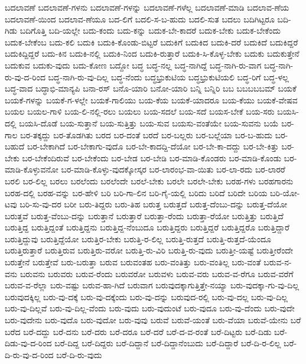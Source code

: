 ಬದಲಾವಣೆ
ಬದಲಾವಣೆ-ಗಳನು
ಬದಲಾವಣೆ-ಗಳನ್ನು
ಬದಲಾವಣೆ-ಗಳೆಲ್ಲ
ಬದಲಾವಣೆ-ಮಾಡಿ
ಬದಲಾವ-ಣೆಯ
ಬದಲಾವಣೆ-ಯಿಂದ
ಬದಲಾವ-ಣೆಯೂ
ಬದ-ಲಿಗೆ
ಬದಲಿ-ಸ-ಬ-ಹುದು
ಬದಲಿ-ಸುತ
ಬದಲು
ಬದಿಗಿಟ್ಟರೂ
ಬದಿ-ಗಿಡು
ಬದಿಗೊತ್ತಿ
ಬದಿ-ಯಲ್ಲೇ
ಬದು-ಕಂದು
ಬದು-ಕನ್ನು
ಬದುಕ-ಬೇ-ಕಾದರೆ
ಬದುಕ-ಬೇಕು
ಬದುಕ-ಬೇಕೆಂದು
ಬದುಕ-ಬೇಕೆಂಬ
ಬದು-ಕಲಿ
ಬದುಕಿ
ಬದುಕಿ-ಕೊಂಡು-ಬಿಟ್ಟರೆ
ಬದುಕಿಗೆ
ಬದುಕಿದ
ಬದುಕಿ-ದರೆ
ಬದುಕಿದೆ
ಬದುಕಿದ್ದರೆ
ಬದುಕಿದ್ದಿದ್ದರೆ
ಬದು-ಕಿನ
ಬದುಕಿ-ನಲ್ಲಿ
ಬದುಕಿ-ನಿಂದ
ಬದುಕಿ-ರುತ್ತಾರೆ
ಬದುಕಿ-ಸಿ-ಕೊಳ್ಳ-ಬೇಕು
ಬದುಕು
ಬದುಕುತ್ತೇನೆ
ಬದುಕುವ
ಬದುಕು-ವುದು
ಬದು-ಕೋಣ
ಬದ್ದೋ
ಬದ್ಧ
ಬದ್ಧ-ನಲ್ಲ
ಬದ್ಧ-ನಾಗಿದ್ದೆ
ಬದ್ಧ-ನಾಗಿ-ರು-ವಾಗ
ಬದ್ಧ-ನಾಗಿ-ರು-ವು-ದ-ರಿಂದ
ಬದ್ಧ-ನಾಗಿ-ರು-ವು-ದಿಲ್ಲ
ಬದ್ಧ-ನೆಂದು
ಬದ್ಧಭ್ರುಕುಟಿಯ
ಬದ್ಧಭ್ರುಕುಟಿಯಲಿ
ಬದ್ಧ-ರಿಗೆ
ಬದ್ಧ-ಳಲ್ಲ
ಬದ್ಧ-ವಾದ
ಬದ್ಧಾಭಿ-ಮಾನ್ಯಪಿ
ಬನಾ-ರಸ್
ಬನೊ-ಯಾರಿ
ಬನೋ-ಯಾರಿ
ಬನ್ನಿ
ಬನ್ನಿರಿ
ಬಬ
ಬಬಬಬಬಮ್
ಬಯಕೆ
ಬಯಕೆ-ಗಳನ್ನು
ಬಯಕೆ-ಗ-ಳಲ್ಲೇ
ಬಯಕೆ-ಗಾಲಿಯು
ಬಯ-ಕೆಯ
ಬಯಕೆ-ಯಾದರೂ
ಬಯ-ಕೆಯು
ಬಯಕೆ-ವೇಷವ
ಬಯಲ
ಬಯಲ-ಗಾಳಿ
ಬಯ-ಲಿ-ನಲ್ಲಿ-ರಲು
ಬಯಲು
ಬಯ-ಸದಲೆ
ಬಯ-ಸದೆ
ಬಯಸ-ಬೇಕೆ
ಬಯ-ಸರು
ಬಯಸಿ-ದಲ್ಲಿ
ಬಯಸಿ-ದೊಡೆ
ಬಯ-ಸುತ್ತಾನೆ
ಬಯ-ಸುತ್ತಿತ್ತು
ಬಯ-ಸುವ
ಬಯಸು-ವಂತೆಯೇ
ಬಯ-ಸುವನು
ಬಯೆ
ಬರ-ಗಾಲ
ಬರ-ತಕ್ಕದ್ದು
ಬರ-ತೊಡಗಿತು
ಬರದ
ಬರ-ದಂತೆ
ಬರದೆ
ಬರ-ಬಲ್ಲರು
ಬರ-ಬಲ್ಲೆಯಾ
ಬರ-ಬ-ಹುದು
ಬರ-ಬಹುದೆ
ಬರ-ಬೇಕಾಗಿದೆ
ಬರ-ಬೇಕಾಗು-ವುದೊ
ಬರ-ಬೇ-ಕಾದದ್ದಿ-ದೆಯೋ
ಬರ-ಬೇ-ಕಾ-ದದ್ದು
ಬರ-ಬೇ-ಕಿತ್ತು
ಬರ-ಬೇಕು
ಬರ-ಬೇಕೆಂದಿರುವೆ
ಬರ-ಬೇಕೆಂದು
ಬರ-ಬೇಡ
ಬರ-ಬೇಡಿ
ಬರ-ಮಾಡಿ-ಕೊಂಡರು
ಬರ-ಮಾಡಿ-ಕೊಂಡು
ಬರ-ಮಾಡಿ-ಕೊಳ್ಳುವನೋ
ಬರ-ಮಾಡಿ-ಕೊಳ್ಳು-ವುದಕ್ಕೋಸ್ಕರ
ಬರ-ಲಾರಂಭ-ವಾ-ಯಿತು
ಬರ-ಲಾ-ರದು
ಬರ-ಲಾರರೆ
ಬರಲಿ
ಬರ-ಲಿಲ್ಲ
ಬರಲು
ಬರಲೆಂದು
ಬರಲೆಂದೇ
ಬರಲೆ-ಬೇಕು
ಬರಲೇ
ಬರಲೇ-ಬೇಕು
ಬರಹ-ಗಳು
ಬರಹಗಾರನು
ಬರಹ-ದಲ್ಲಿ
ಬರಹ-ವನ್ನು
ಬರ-ಹೇಳಿ
ಬರಿ
ಬರಿ-ಗಾ-ಲಿನ
ಬರಿ-ಗೈ-ಯಲ್ಲಿ
ಬರಿದು
ಬರಿದೆ
ಬರಿದೇ
ಬರಿಯ
ಬರಿ-ಯೋ-ಟವು
ಬರಿ-ಸು-ವು-ದರ
ಬರೀ
ಬರು-ತಿದ್ದರು
ಬರು-ತಿಹ
ಬರುತ್ತ
ಬರುತ್ತದೆ
ಬರುತ್ತ-ದೆಂಬು-ದನ್ನು
ಬರುತ್ತ-ದೆಯೋ
ಬರುತ್ತವೆ
ಬರುತ್ತ-ವೆಂಬು-ದನ್ನು
ಬರುತ್ತಾನೆ
ಬರುತ್ತಾರೆ
ಬರುತ್ತಾ-ರೆಂದು
ಬರುತ್ತಾ-ರೆಯೋ
ಬರುತ್ತಿತ್ತು
ಬರುತ್ತಿದೆ
ಬರುತ್ತಿದ್ದ
ಬರುತ್ತಿದ್ದಂತೆ
ಬರುತ್ತಿದ್ದನು
ಬರುತ್ತಿದ್ದ-ನೆಂಬುದೂ
ಬರುತ್ತಿದ್ದರು
ಬರುತ್ತಿದ್ದರೆ
ಬರುತ್ತಿದ್ದರೊ
ಬರುತ್ತಿದ್ದಾರೆ
ಬರುತ್ತಿದ್ದುವು
ಬರುತ್ತಿದ್ದೆಯೋ
ಬರುತ್ತಿರ-ಬೇಕು
ಬರುತ್ತಿ-ರ-ಲಿಲ್ಲ
ಬರುತ್ತಿ-ರುತ್ತದೆ
ಬರುತ್ತಿ-ರುತ್ತದೆ-ಯೆಂದೂ
ಬರುತ್ತಿರುತ್ತಾರೆ
ಬರುತ್ತಿರುವ
ಬರುತ್ತಿರು-ವರೋ
ಬರುತ್ತಿ-ರು-ವಿರಿ
ಬರುತ್ತಿ-ರು-ವುದು
ಬರುತ್ತೀ-ಯಷ್ಟೆ
ಬರುತ್ತೀರೆಂದೇ
ಬರುತ್ತೇನೆ
ಬರುತ್ತೇವೆ
ಬರು-ಬರುತ್ತಾ
ಬರುವ
ಬರುವಂತಹ
ಬರು-ವಂತಿತ್ತು
ಬರು-ವಂತಿಲ್ಲ
ಬರು-ವಂತೆ
ಬರುವ-ನ-ವನು
ಬರುವನು
ಬರುವರು
ಬರುವ-ರೆಂದು
ಬರುವರೋ
ಬರುವಳು
ಬರುವ-ವರು
ಬರುವ-ವ-ರೆಗೂ
ಬರುವ-ವರೆಗೆ
ಬರುವ-ವ-ರೆಲ್ಲಾ
ಬರು-ವಷ್ಟು
ಬರುವ-ಹಾ-ಗಿದೆ
ಬರುವಾಗ
ಬರುವುದಕ್ಕಾಗುತ್ತಿತ್ತೇ-ನಯ್ಯಾ
ಬರು-ವುದಕ್ಕಾ-ಗು-ವು-ದಿಲ್ಲ
ಬರುವುದಕ್ಕಿಲ್ಲ
ಬರು-ವು-ದಕ್ಕೆ
ಬರು-ವು-ದಕ್ಕೆಂದು
ಬರು-ವು-ದನ್ನು
ಬರುವುದ-ರಲ್ಲಿ
ಬರು-ವು-ದಲ್ಲ
ಬರು-ವು-ದಿಲ್ಲ
ಬರು-ವು-ದಿಲ್ಲವೆ
ಬರು-ವು-ದಿಲ್ಲ-ವೆಂದು
ಬರು-ವುದು
ಬರು-ವುದುಂಟೆ
ಬರು-ವುದೂ
ಬರು-ವು-ದೆಂದು
ಬರು-ವುದೇ
ಬರು-ವುದೇನು
ಬರು-ವುದೊ
ಬರು-ವುದೋ
ಬರು-ವುವು
ಬರುವೆ
ಬರುವೆ-ಯಂತೆ
ಬರು-ವೆಯಾ
ಬರುವೆ-ಯೇನು
ಬರೆ
ಬರೆದ
ಬರೆ-ದದ್ದು
ಬರೆ-ದನು
ಬರೆ-ದರು
ಬರೆ-ದರೂ
ಬರೆ-ದರೆ
ಬರೆ-ದ-ವ-ರಂತೆ
ಬರೆ-ದಿಟ್ಟರು
ಬರೆ-ದಿಡು
ಬರೆ-ದಿಡು-ವು-ದ-ರಿಂದ
ಬರೆ-ದಿದ್ದ
ಬರೆ-ದಿದ್ದರು
ಬರೆ-ದಿದ್ದಾನೆ
ಬರೆ-ದಿದ್ದಾನೆಂಬುದು
ಬರೆ-ದಿದ್ದಾರೆ
ಬರೆ-ದಿ-ರ-ಲಿಲ್ಲ
ಬರೆ-ದಿ-ರು-ವು-ದ-ರಿಂದ
ಬರೆ-ದಿ-ರು-ವುದು
